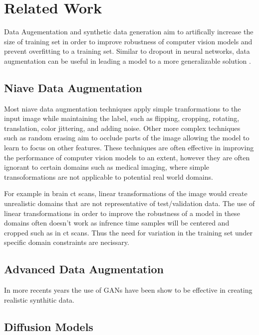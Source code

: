 \documentclass{article}
\begin{document}
\section{Related Work}

Data Augementation and synthetic data generation aim to artifically increase the size of training set in order to improve robustness
of computer vision models and prevent overfitting to a training set. Similar to dropout in neural networks, data augmentation can be
useful in leading a model to a more generalizable solution \cite{1708.04896}.

\subsection{Niave Data Augmentation}

Most niave data augmentation techniques apply simple tranformations to the input image while maintaining the label, such as flipping,
cropping, rotating, translation, color jittering, and adding noise. Other more complex techniques such as random erasing aim to occlude
parts of the image allowing the model to learn to focus on other features. These techniques are often effective in improving the performance
of computer vision models to an extent, however they are often ignorant to certain domains such as medical imaging, where simple
transoformations are not applicable to potential real world domains.

For example in brain ct scans, linear transformations of the image would create unrealistic domains that are not representative of test/validation data. 
The use of linear transformations in order to improve the robustness of a model in these domains often doesn't work as infrence time samples will be centered 
and cropped such as in ct scans. Thus the need for variation in the training set under specific domain constraints are necissary. 

\subsection{Advanced Data Augmentation}

In more recents years the use of GANs have been show to be effective in creating realistic synthitic data. 

\subsection{Diffusion Models}
\end{document}
